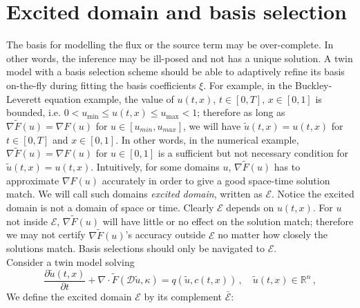 \documentclass[a4paper,onecolumn]{article}
\newtheorem{definition}{Definition}
\theoremstyle{remark}
\begin{document}
\section{Excited domain and basis selection}
\label{adaptive}
The basis for modelling the flux or the source term may be over-complete.
In other words, the inference may be ill-posed and not has a unique solution.
A twin model with a basis selection scheme should be able to adaptively
refine its basis on-the-fly during fitting the basis coefficients $\xi$.
For example, in the Buckley-Leverett equation example,
the value of $u(t,x)$, $t\in[0,T],\,x\in[0,1]$ is bounded, i.e.
$0< u_{\min}\le u(t,x)\le u_{\max} < 1$; therefore as long as 
$\nabla\tilde{F}(u) = \nabla F(u)$ for $u\in[u_{min},u_{max}]$, we will have
$\tilde{u}(t,x) = u(t,x)$ for $t\in[0,T]$ and $x\in[0,1]$.
In other words, in the numerical example, $\nabla \tilde{F}(u) = \nabla F(u)$ for $u\in [0,1]$
is a sufficient but not necessary condition
for $\tilde{u}(t,x) = u(t,x)$. 
Intuitively, for some domains $u$, $\nabla \tilde{F}(u)$ has to approximate $\nabla F(u)$
accurately in order to give a good space-time solution match.
We will call such domains \emph{excited domain}, written as $\mathcal{E}$. 
Notice the excited domain is not a domain of space or time.  
Clearly $\mathcal{E}$ depends on $u(t,x)$.
For $u$ not inside $\mathcal{E}$,
$\nabla \tilde{F}(u)$ will have little or no effect on the solution match; therefore
we may not certify $\nabla \tilde{F}(u)$'s accuracy outside $\mathcal{E}$
no matter how closely the solutions match.
Basis selections should only be navigated to $\mathcal{E}$.\\

\noindent Consider a twin model solving
\begin{equation}
    \frac{\partial\tilde{u}(t,x)}{\partial t} + \nabla \cdot 
    \tilde{F}(\mathcal{D} \tilde{u}, \kappa) 
    = q(\tilde{u},c(t,x))\,, \quad \tilde{u}(t,x) \in \mathbb{R}^n\,,
    \label{twin equation def}
\end{equation}
We define the excited domain $\mathcal{E}$ by its complement $\bar{\mathcal{E}}$:\\
\\
\end{document}
